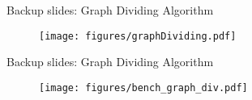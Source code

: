 \documentclass[10pt]{beamer}
\begin{document}

\begin{frame}[fragile]{Backup slides: Graph Dividing Algorithm}
    \begin{figure}[h!]
        \centering
            \texttt{[image: figures/graphDividing.pdf]}
    \end{figure}
\end{frame}

\begin{frame}[fragile]{Backup slides: Graph Dividing Algorithm}
    \begin{figure}[h!]
        \centering
            \texttt{[image: figures/bench\_graph\_div.pdf]}
    \end{figure}
\end{frame}
\end{document}
